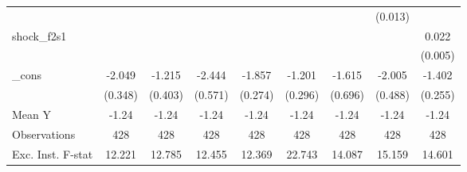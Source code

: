 {\begin{tabular}{l*{8}{c}}
            &                     &                     &                     &                     &                     &                     &     (0.013)         &                     \\
\addlinespace
shock\_f2s1  &                     &                     &                     &                     &                     &                     &                     &       0.022\sym{***}\\
            &                     &                     &                     &                     &                     &                     &                     &     (0.005)         \\
\addlinespace
\_cons      &      -2.049\sym{***}&      -1.215\sym{***}&      -2.444\sym{***}&      -1.857\sym{***}&      -1.201\sym{***}&      -1.615\sym{**} &      -2.005\sym{***}&      -1.402\sym{***}\\
            &     (0.348)         &     (0.403)         &     (0.571)         &     (0.274)         &     (0.296)         &     (0.696)         &     (0.488)         &     (0.255)         \\
\midrule
Mean Y      &       -1.24         &       -1.24         &       -1.24         &       -1.24         &       -1.24         &       -1.24         &       -1.24         &       -1.24         \\
Observations&         428         &         428         &         428         &         428         &         428         &         428         &         428         &         428         \\
Exc. Inst. F-stat&      12.221         &      12.785         &      12.455         &      12.369         &      22.743         &      14.087         &      15.159         &      14.601         \\
\bottomrule
\end{tabular}
}

